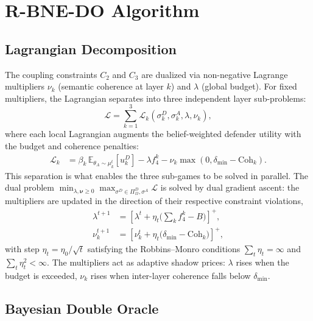 \documentclass[conference]{IEEEtran}
\newcommand{\E}{\mathbb{E}}
\newcommand{\Coh}{\mathrm{Coh}}
\begin{document}
\section{R-BNE-DO Algorithm}
\label{sec:algo}

\subsection{Lagrangian Decomposition}

The coupling constraints $C_2$ and $C_3$ are dualized via non-negative Lagrange
multipliers $\nu_k$ (semantic coherence at layer $k$) and $\lambda$ (global
budget). For fixed multipliers, the Lagrangian separates into three independent
layer sub-problems:
\begin{equation}
\mathcal{L} = \sum_{k=1}^3 \mathcal{L}_k(\sigma_k^D,\sigma_k^A,\lambda,\nu_k),
\label{eq:lagrangian}
\end{equation}
where each local Lagrangian augments the belief-weighted defender utility with
the budget and coherence penalties:
\begin{align}
\mathcal{L}_k &= \beta_k\,\E_{\theta_A\sim\mu_k^t}\!\left[u_k^D\right]
- \lambda f_4^k
- \nu_k\max\!\left(0, \delta_{\min}-\Coh_k\right).
\end{align}
This separation is what enables the three sub-games to be solved in parallel.
The dual problem
$\min_{\lambda,\boldsymbol{\nu}\geq0}\max_{\sigma^D\in\Pi^D_\Omega,\sigma^A}
\mathcal{L}$ is solved by dual gradient ascent: the multipliers are updated in
the direction of their respective constraint violations,
\begin{align}
\lambda^{t+1} &= \left[\lambda^t + \eta_t\Big(\textstyle\sum_k f_4^k - B\Big)
\right]^+,\\
\nu_k^{t+1} &= \left[\nu_k^t + \eta_t\big(\delta_{\min}-\Coh_k\big)\right]^+,
\end{align}
with step $\eta_t=\eta_0/\sqrt{t}$ satisfying the Robbins--Monro conditions
$\sum_t\eta_t=\infty$ and $\sum_t\eta_t^2<\infty$. The multipliers act as
adaptive shadow prices: $\lambda$ rises when the budget is exceeded, $\nu_k$
rises when inter-layer coherence falls below $\delta_{\min}$.

\subsection{Bayesian Double Oracle}
\end{document}
